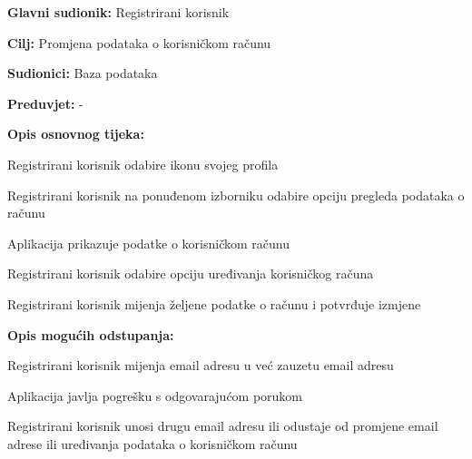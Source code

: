 				
				\noindent {}
				\begin{packed_item}
					
					\item \textbf{Glavni sudionik:} Registrirani korisnik
					\item  \textbf{Cilj:} Promjena podataka o korisničkom računu
					\item  \textbf{Sudionici:} Baza podataka
					\item  \textbf{Preduvjet:} -
					
					\item  \textbf{Opis osnovnog tijeka:}
					\item[] \begin{packed_enum}
						\item Registrirani korisnik odabire ikonu svojeg profila
						\item Registrirani korisnik na ponuđenom izborniku odabire opciju pregleda podataka o računu
						\item Aplikacija prikazuje podatke o korisničkom računu
						\item Registrirani korisnik odabire opciju uređivanja korisničkog računa
						\item Registrirani korisnik mijenja željene podatke o računu i potvrđuje izmjene
					\end{packed_enum}
					
					\item  \textbf{Opis mogućih odstupanja:}
					\item[] \begin{packed_item}
						\item[5.a] Registrirani korisnik mijenja email adresu u već zauzetu email adresu
						\item[] \begin{packed_enum}
							\item Aplikacija javlja pogrešku s odgovarajućom porukom
							\item Registrirani korisnik unosi drugu email adresu ili odustaje od promjene email adrese ili uređivanja podataka o korisničkom računu
						\end{packed_enum}
					\end{packed_item}
				\end{packed_item}
				
